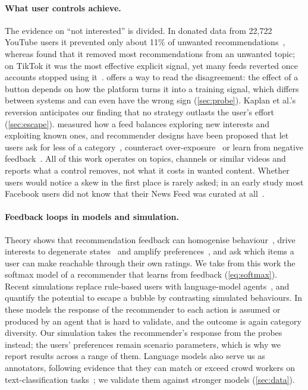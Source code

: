 \paragraph{What user controls achieve.} The evidence on ``not interested'' is divided. In donated data from 22{,}722 YouTube users it prevented only about 11\% of unwanted recommendations~\citep{ricks2022button}, whereas \citet{liu2024train} found that it removed most recommendations from an unwanted topic; on TikTok it was the most effective explicit signal, yet many feeds reverted once accounts stopped using it~\citep{kaplan2026foryou}.  offers a way to read the disagreement: the effect of a button depends on how the platform turns it into a training signal, which differs between systems and can even have the wrong sign (\cref{sec:probe}). Kaplan et al.'s reversion anticipates our finding that no strategy outlasts the user's effort (\cref{sec:escape}). \citet{vombatkere2024tiktok} measured how a feed balances exploring new interests and exploiting known ones, and recommender designs have been proposed that let users ask for less of a category~\citep{wang2022controllable}, counteract over-exposure~\citep{gao2024cirs} or learn from negative feedback~\citep{wang2023negative}. All of this work operates on topics, channels or similar videos and reports what a control removes, not what it costs in wanted content. Whether users would notice a skew in the first place is rarely asked; in an early study most Facebook users did not know that their News Feed was curated at all~\citep{eslami2015feed}.

\paragraph{Feedback loops in models and simulation.} Theory shows that recommendation feedback can homogenise behaviour~\citep{chaney2018confounding}, drive interests to degenerate states~\citep{jiang2019degenerate} and amplify preferences~\citep{kalimeris2021amplification}, and \citet{dean2020reachability} ask which items a user can make reachable through their own ratings. We take from this work the softmax model of a recommender that learns from feedback (\cref{eq:softmax}). Recent simulations replace rule-based users with language-model agents~\citep{zhang2024agent4rec,sukiennik2025simtok,yang2026recloop}, and \citet{feng2026bep} quantify the potential to escape a bubble by contrasting simulated behaviours. In these models the response of the recommender to each action is assumed or produced by an agent that is hard to validate, and the outcome is again category diversity. Our simulation takes the recommender's response from the probes instead; the users' preferences remain scenario parameters, which is why we report results across a range of them. Language models also serve us as annotators, following evidence that they can match or exceed crowd workers on text-classification tasks~\citep{gilardi2023chatgpt}; we validate them against stronger models (\cref{sec:data}).


